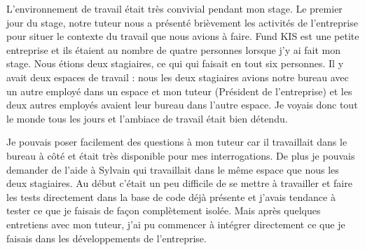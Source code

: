 L'environnement de travail était très convivial pendant mon stage. Le premier jour du stage, notre tuteur nous a présenté brièvement les activités de l'entreprise pour situer le contexte du travail que nous avions à faire. Fund KIS est une petite entreprise et ils étaient au nombre de quatre personnes lorsque j'y ai fait mon stage. Nous étions deux stagiaires, ce qui qui faisait en tout six personnes. Il y avait deux espaces de travail : nous les deux stagiaires avions notre bureau avec un autre employé dans un espace et mon tuteur (Président de l'entreprise) et les deux autres employés avaient leur bureau dans l'autre espace. Je voyais donc tout le monde tous les jours et l'ambiace de travail était bien détendu.

\vspace{3mm}

Je pouvais poser facilement des questions à mon tuteur car il travaillait dans le bureau à côté et était très disponible pour mes interrogations. De plus je pouvais demander de l'aide à Sylvain qui travaillait dans le même espace que nous les deux stagiaires. Au début c'était un peu difficile de se mettre à travailler et faire les tests directement dans la base de code déjà présente et j'avais tendance à tester ce que je faisais de façon complètement isolée. Mais après quelques entretiens avec mon tuteur, j'ai pu commencer à intégrer directement ce que je faisais dans les développements de l'entreprise.
